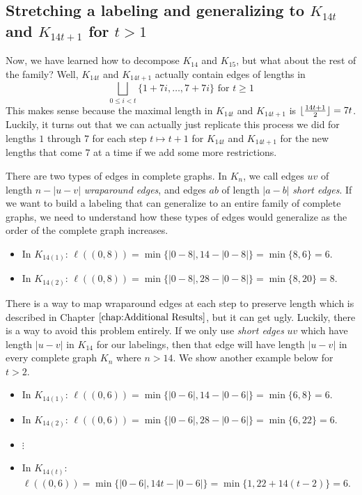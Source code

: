 \subsection{Stretching a labeling and generalizing to $K_{14t}$ and $K_{14t+1}$ for $t>1$}\label{sec:0,1constr-pt2}

  Now, we have learned how to decompose $K_{14}$ and $K_{15}$, but what about the rest of the family? Well, $K_{14t}$ and $K_{14t+1}$ actually contain edges of lengths in 
  $$\bigsqcup_{0\leq i< t} \{1+7i,\hdots,7+7i\}\text{ for }t\geq 1$$
  This makes sense because the maximal length in $K_{14t}$ and $K_{14t+1}$ is $\lfloor\frac{14t+1}{2}\rfloor=7t$. Luckily, it turns out that we can actually just replicate this process we did for lengths $1$ through $7$ for each step $t\mapsto t+1$ for $K_{14t}$ and $K_{14t+1}$ for the new lengths that come $7$ at a time if we add some more restrictions.

  There are two types of edges in complete graphs. In $K_{n}$, we call edges $uv$ of length $n-|u-v|$ \textit{wraparound edges}, and edges $ab$ of length $|a-b|$ \textit{short edges}. If we want to build a labeling that can generalize to an entire family of complete graphs, we need to understand how these types of edges would generalize as the order of the complete graph increases.
  \begin{itemize}
    \item[] In $K_{14(1)}$: $\ell((0,8))=\min\{|0-8|,14-|0-8|\}=\min\{8,6\}=6$.
    \item[] In $K_{14(2)}$: $\ell((0,8))=\min\{|0-8|,28-|0-8|\}=\min\{8,20\}=8$.
  \end{itemize}
  There is a way to map wraparound edges at each step to preserve length which is described in Chapter $\ref{chap:Additional Results}$, but it can get ugly. Luckily, there is a way to avoid this problem entirely. If we only use \textit{short edges} $uv$ which have length $|u-v|$ in $K_{14}$ for our labelings, then that edge will have length $|u-v|$ in every complete graph $K_{n}$ where $n>14$. We show another example below for $t>2$. 
  \begin{itemize}
    \item[] In $K_{14(1)}$: $\ell((0,6))=\min\{|0-6|,14-|0-6|\}=\min\{6,8\}=6$.
    \item[] In $K_{14(2)}$: $\ell((0,6))=\min\{|0-6|,28-|0-6|\}=\min\{6,22\}=6$.
    \item[] $\vdots$
    \item[] In $K_{14(t)}$: $\ell((0,6))=\min\{|0-6|,14t-|0-6|\}=\min\{1,22+14(t-2)\}=6$.
  \end{itemize}

